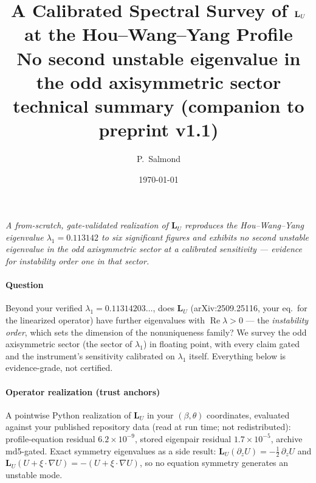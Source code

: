 \documentclass[10pt]{article}
\title{\vspace{-1.4em}\bfseries A Calibrated Spectral Survey of $\LU$ at
the Hou--Wang--Yang Profile\\[0.2em]\large\mdseries
No second unstable eigenvalue in the odd axisymmetric sector
\textemdash{} technical summary (companion to preprint v1.1)}
\author{P.~Salmond}
\date{\today}
\newcommand{\LU}{\mathbf{L}_{U}}
\begin{document}
\maketitle
\vspace{-1.8em}

\begin{center}\itshape\small
A from-scratch, gate-validated realization of $\LU$ reproduces the
Hou--Wang--Yang eigenvalue $\lambda_1=0.113142$ to six significant
figures and exhibits no second unstable eigenvalue in the odd
axisymmetric sector at a calibrated sensitivity --- evidence for
instability order one in that sector.
\end{center}
\vspace{0.4em}

\paragraph{Question} Beyond your verified $\lambda_1 = 0.11314203\ldots$,
does $\LU$ (arXiv:2509.25116, your eq.\ for the linearized operator)
have further eigenvalues with $\operatorname{Re}\lambda > 0$ --- the
\emph{instability order}, which sets the dimension of the nonuniqueness
family? We survey the odd axisymmetric sector (the sector of
$\lambda_1$) in floating point, with every claim gated and the
instrument's sensitivity calibrated on $\lambda_1$ itself. Everything
below is evidence-grade, not certified.

\paragraph{Operator realization (trust anchors)} A pointwise Python
realization of $\LU$ in your $(\beta,\theta)$ coordinates, evaluated
against your published repository data (read at run time; not
redistributed): profile-equation residual $6.2\times 10^{-9}$, stored
eigenpair residual $1.7\times 10^{-5}$, archive md5-gated. Exact
symmetry eigenvalues as a side result: $\LU(\partial_z U) =
-\tfrac12\,\partial_z U$ and $\LU(U + \xi\!\cdot\!\nabla U) =
-(U + \xi\!\cdot\!\nabla U)$, so no equation symmetry generates an
unstable mode.
\end{document}
